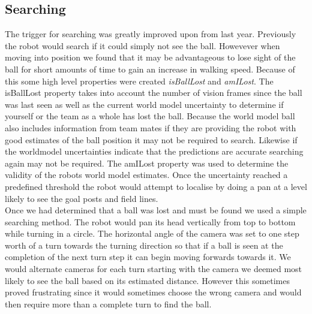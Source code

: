 \subsection{Searching}
The trigger for searching was greatly improved upon from last year. Previously the robot would search if it could simply not see the ball. Howevever when moving into position we found that it may be advantageous to lose sight of the ball for short amounts of time to gain an increase in walking speed. Because of this some high level properties were created \emph{isBallLost} and \emph{amILost}. The isBallLost property takes into account the number of vision frames since the ball was last seen as well as the current world model uncertainty to determine if yourself or the team as a whole has lost the ball. Because the world model ball also includes information from team mates if they are providing the robot with good estimates of the ball position it may not be required to search. Likewise if the worldmodel uncertainties indicate that the predictions are accurate searching again may not be required. The amILost property was used to determine the validity of the robots world model estimates. Once the uncertainty reached a predefined threshold the robot would attempt to localise by doing a pan at a level likely to see the goal posts and field lines.\\

Once we had determined that a ball was lost and must be found we used a simple searching method. The robot would pan its head vertically from top to bottom while turning in a circle. The horizontal angle of the camera was set to one step worth of a turn towards the turning direction so that if a ball is seen at the completion of the next turn step it can begin moving forwards towards it. We would alternate cameras for each turn starting with the camera we deemed most likely to see the ball based on its estimated distance. However this sometimes proved frustrating since it would sometimes choose the wrong camera and would then require more than a complete turn to find the ball.\\


